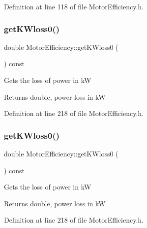 Definition at line 118 of file Motor\+Efficiency.\+h.

\mbox{\label{class_motor_efficiency_a47398ac8203f5b79a0ca435673a4bc16}} 
\subsubsection{\texorpdfstring{get\+K\+Wloss0()}{getKWloss0()}\hspace{0.1cm}{\footnotesize\ttfamily [1/3]}}
{\footnotesize\ttfamily double Motor\+Efficiency\+::get\+K\+Wloss0 (\begin{DoxyParamCaption}{ }\end{DoxyParamCaption}) const\hspace{0.3cm}{\ttfamily [inline]}}

Gets the loss of power in kW

\begin{DoxyReturn}{Returns}
double, power loss in kW 
\end{DoxyReturn}


Definition at line 218 of file Motor\+Efficiency.\+h.

\mbox{\label{class_motor_efficiency_a47398ac8203f5b79a0ca435673a4bc16}} 
\subsubsection{\texorpdfstring{get\+K\+Wloss0()}{getKWloss0()}\hspace{0.1cm}{\footnotesize\ttfamily [2/3]}}
{\footnotesize\ttfamily double Motor\+Efficiency\+::get\+K\+Wloss0 (\begin{DoxyParamCaption}{ }\end{DoxyParamCaption}) const\hspace{0.3cm}{\ttfamily [inline]}}

Gets the loss of power in kW

\begin{DoxyReturn}{Returns}
double, power loss in kW 
\end{DoxyReturn}


Definition at line 218 of file Motor\+Efficiency.\+h.


